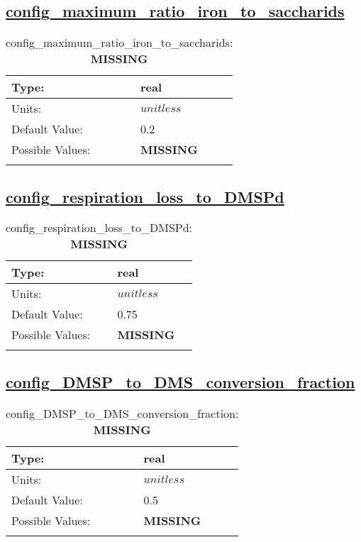 \subsection[config\_maximum\_ratio\_iron\_to\_saccharids]{\hyperref[sec:nm_tab_biogeochemistry]{config\_maximum\_ratio\_iron\_to\_saccharids}}
\label{subsec:nm_sec_config_maximum_ratio_iron_to_saccharids}
\begin{center}
\begin{longtable}{| p{2.0in} || p{4.0in} |}
    \hline
    Type: & real \\
    \hline
    Units: & $unitless$ \\
    \hline
    Default Value: & 0.2 \\
    \hline
    Possible Values: & {\bf \color{red} MISSING} \\
    \hline
    \caption{config\_maximum\_ratio\_iron\_to\_saccharids: {\bf \color{red} MISSING}}
\end{longtable}
\end{center}
\subsection[config\_respiration\_loss\_to\_DMSPd]{\hyperref[sec:nm_tab_biogeochemistry]{config\_respiration\_loss\_to\_DMSPd}}
\label{subsec:nm_sec_config_respiration_loss_to_DMSPd}
\begin{center}
\begin{longtable}{| p{2.0in} || p{4.0in} |}
    \hline
    Type: & real \\
    \hline
    Units: & $unitless$ \\
    \hline
    Default Value: & 0.75 \\
    \hline
    Possible Values: & {\bf \color{red} MISSING} \\
    \hline
    \caption{config\_respiration\_loss\_to\_DMSPd: {\bf \color{red} MISSING}}
\end{longtable}
\end{center}
\subsection[config\_DMSP\_to\_DMS\_conversion\_fraction]{\hyperref[sec:nm_tab_biogeochemistry]{config\_DMSP\_to\_DMS\_conversion\_fraction}}
\label{subsec:nm_sec_config_DMSP_to_DMS_conversion_fraction}
\begin{center}
\begin{longtable}{| p{2.0in} || p{4.0in} |}
    \hline
    Type: & real \\
    \hline
    Units: & $unitless$ \\
    \hline
    Default Value: & 0.5 \\
    \hline
    Possible Values: & {\bf \color{red} MISSING} \\
    \hline
    \caption{config\_DMSP\_to\_DMS\_conversion\_fraction: {\bf \color{red} MISSING}}
\end{longtable}
\end{center}
